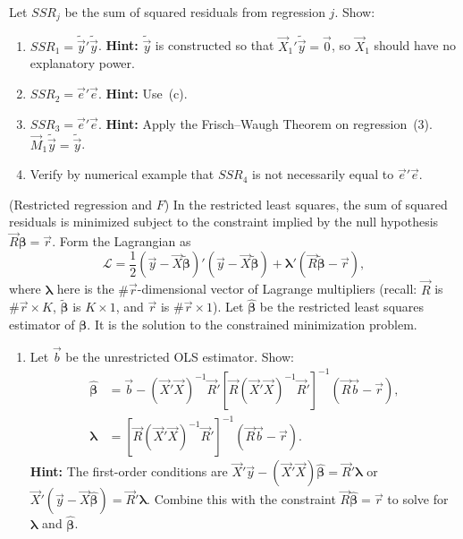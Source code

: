 \begin{problemset}
\begin{enumerate}[label=(\alph*),resume]
Let $SSR_j$ be the sum of squared residuals from regression $j$. Show:

\begin{enumerate}[label=(\roman*)]
\item $SSR_1 = \tilde{\vec{y}}'\tilde{\vec{y}}$.
\textbf{Hint:} $\tilde{\vec{y}}$ is constructed so that
$\vec{X}_1'\tilde{\vec{y}} = \vec{0}$, so $\vec{X}_1$ should have
no explanatory power.

\item $SSR_2 = \vec{e}'\vec{e}$. \textbf{Hint:} Use~(c).

\item $SSR_3 = \vec{e}'\vec{e}$. \textbf{Hint:} Apply the Frisch--Waugh
Theorem on regression~(3). $\vec{M}_1\tilde{\vec{y}} = \tilde{\vec{y}}$.

\item Verify by numerical example that $SSR_4$ is not necessarily equal to
$\vec{e}'\vec{e}$.
\end{enumerate}
\end{enumerate}

\exercise[5] (Restricted regression and $F$)\quad
In the restricted least squares, the sum of squared residuals is minimized
subject to the constraint implied by the null hypothesis
$\vec{R}\bm{\beta} = \vec{r}$. Form the Lagrangian as
%
\[
\mathcal{L} = \frac{1}{2}(\vec{y} - \vec{X}\widetilde{\bm{\beta}})'
(\vec{y} - \vec{X}\widetilde{\bm{\beta}})
+ \bm{\lambda}'(\vec{R}\widetilde{\bm{\beta}} - \vec{r}),
\]
%
where $\bm{\lambda}$ here is the $\#\vec{r}$-dimensional vector of Lagrange
multipliers (recall: $\vec{R}$ is $\#\vec{r} \times K$,
$\widetilde{\bm{\beta}}$ is $K \times 1$, and $\vec{r}$ is
$\#\vec{r} \times 1$). Let $\widehat{\bm{\beta}}$ be the restricted least
squares estimator of $\bm{\beta}$. It is the solution to the constrained
minimization problem.

\begin{enumerate}[label=(\alph*)]
\item Let $\vec{b}$ be the unrestricted OLS estimator. Show:
%
\begin{align}
\widehat{\bm{\beta}} &= \vec{b} - (\vec{X}'\vec{X})^{-1}\vec{R}'
[\vec{R}(\vec{X}'\vec{X})^{-1}\vec{R}']^{-1}(\vec{R}\vec{b} - \vec{r}),
\label{eq:ps1.5a1} \\
\bm{\lambda} &= [\vec{R}(\vec{X}'\vec{X})^{-1}\vec{R}']^{-1}
(\vec{R}\vec{b} - \vec{r}). \label{eq:ps1.5a2}
\end{align}
%
\textbf{Hint:} The first-order conditions are
$\vec{X}'\vec{y} - (\vec{X}'\vec{X})\widehat{\bm{\beta}} = \vec{R}'\bm{\lambda}$
or $\vec{X}'(\vec{y} - \vec{X}\widehat{\bm{\beta}}) = \vec{R}'\bm{\lambda}$.
Combine this with the constraint
$\vec{R}\widehat{\bm{\beta}} = \vec{r}$ to solve for $\bm{\lambda}$ and
$\widehat{\bm{\beta}}$.


\end{enumerate}
\end{problemset}
